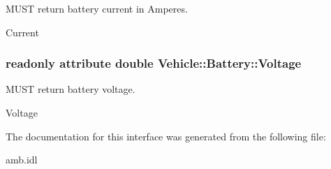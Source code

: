 M\-U\-S\-T return battery current in Amperes. 

Current \hypertarget{interfaceVehicle_1_1Battery_a1c01ff53b9c0f33e88e54e66ce139be8}{
\subsubsection[{Voltage}]{\setlength{\rightskip}{0pt plus 5cm}readonly attribute double Vehicle\-::\-Battery\-::\-Voltage}}\label{interfaceVehicle_1_1Battery_a1c01ff53b9c0f33e88e54e66ce139be8}


M\-U\-S\-T return battery voltage. 

Voltage 

The documentation for this interface was generated from the following file\-:\begin{DoxyCompactItemize}
\item 
amb.\-idl\end{DoxyCompactItemize}
